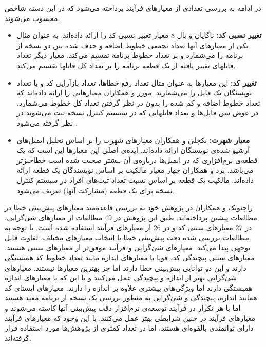 در ادامه به بررسی تعدادی از معیارهای فرآیند پرداخته می‌شود که در این دسته شاخص محسوب می‌شوند. 
\begin{itemize}
\item \textbf{تغییر نسبی کد: }
ناگاپان و بال 8 معیار تغییر نسبی کد را ارائه داده‌اند\cite{nagappan2005use}. به عنوان مثال یکی از معیار‌های آنها تعداد تجمعی خطوط اضافه و حذف شده بین دو نسخه از برنامه را می‌شمارد و بر تعداد خطوط برنامه تقسیم می‌کند. معیار دیگر تعداد فایلهای تغییر یافته از یک قطعه برنامه را بر تعداد  کل فایلها تقسیم می‌کند. 
\item \textbf{تغییر کد: }
این معیارها به عنوان مثال تعداد رفع خطاها، تعداد بازآرایی کد و یا تعداد نویسنگان یک فایل را می‌شمارند. موزر و همکاران معیارهایی را ارائه داده‌اند که تعداد خطوط اضافه و کم شده را بدون در نظر گرفتن تعداد کل خطوط می‌شمارد. در عوض سن فایل‌ها و تعداد فایلهایی که در سیستم کنترل نسخه ثبت می‌شوند در نظر گرفته می‌شود \cite{moser2008comparative}. 
\item \textbf{معیار شهرت: }
 بکچلی و همکاران معیارهای شهرت را بر اساس تحلیل ایمیل‌های آرشیو شده‌ی نویسنگان ارائه داده‌اند. ایده‌ی اصلی این معیارها این است که یک قطعه‌ی  نرم‌افزاری که در ایمیل‌ها درباره‌ی آن بیشتر صحبت شده است خطاخیزتر می‌باشد\cite{bacchelli2010popular}. برد و همکاران چهار معیار مالکیت بر اساس نویسندگان یک قطعه ارائه داده‌اند. مالکیت یک قطعه بر اساس نسبت  تعداد ثبت‌های افراد در سیستم کنترل نسخه برای یک قطعه (مشارکت آنها) تعریف می‌شود. \\
\end{itemize}


راجنویک و همکاران در پژوهش خود به بررسی قاعده‌مند معیارهای پیش‌بینی خطا در مطالعات پیشین پرداخته‌اند.  طبق این پژوهش در 49\lr{\%} مطالعات از معیارهای شئ‌گرایی، در 27\lr{\%} معیارهای سنتی کد و در 26 \lr{\%} از معیارهای فرآیند استفاده شده است. با توجه به مطالعات بررسی شده دقت پیش‌بینی خطا  با انتخاب معیارهای مختلف، تفاوت قابل توجهی  پیدا می‌کند. معیارهای شئ‌گرایی و فرآیند موفق‌تر از معیارهای سنتی هستند. معیارهای سنتی  پیچیدگی کد، قویا با معیارهای اندازه مانند تعداد خطوط کد همبستگی دارند و این دو توانایی پیش‌بینی خطا دارند اما جز بهترین معیارها نیستند. معیارهای شئ‌گرایی بهتر از اندازه و پیچیدگی عمل می‌کنند و با این که با معیارهای اندازه همبستگی دارند اما ویژگی‌های بیشتری علاوه بر اندازه را دارند. معیارهای ایستای کد همانند اندازه، پیچیدگی و شئ‌گرایی به منظور بررسی یک نسخه از برنامه مفید هستند اما با هر تکرار در فرآیند توسعه‌ی نرم‌افزار دقت پیش‌بینی آنها کاسته می‌شوند و معیارهای فرآیند در چنین شرایطی بهتر عمل می‌کنند.  با این وجود  که  معیارهای فرآیند‌  دارای توانمندی بالقوه‌ای  هستند، اما در تعداد کمتری از پژوهش‌ها مورد استفاده قرار گرفته‌اند\cite{radjenovic2013software}. \\
 
